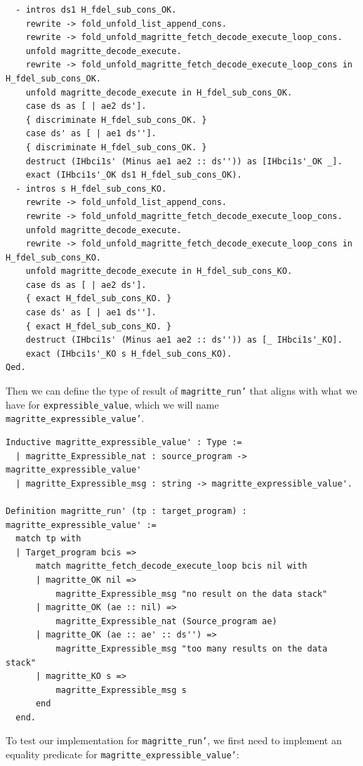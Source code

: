 \documentclass{article}
\begin{document}
\begin{lstlisting}
  - intros ds1 H_fdel_sub_cons_OK.
    rewrite -> fold_unfold_list_append_cons.
    rewrite -> fold_unfold_magritte_fetch_decode_execute_loop_cons.
    unfold magritte_decode_execute.
    rewrite -> fold_unfold_magritte_fetch_decode_execute_loop_cons in H_fdel_sub_cons_OK.
    unfold magritte_decode_execute in H_fdel_sub_cons_OK.
    case ds as [ | ae2 ds'].
    { discriminate H_fdel_sub_cons_OK. }
    case ds' as [ | ae1 ds''].
    { discriminate H_fdel_sub_cons_OK. }    
    destruct (IHbci1s' (Minus ae1 ae2 :: ds'')) as [IHbci1s'_OK _].
    exact (IHbci1s'_OK ds1 H_fdel_sub_cons_OK).
  - intros s H_fdel_sub_cons_KO.
    rewrite -> fold_unfold_list_append_cons.
    rewrite -> fold_unfold_magritte_fetch_decode_execute_loop_cons.
    unfold magritte_decode_execute.
    rewrite -> fold_unfold_magritte_fetch_decode_execute_loop_cons in H_fdel_sub_cons_KO.
    unfold magritte_decode_execute in H_fdel_sub_cons_KO.
    case ds as [ | ae2 ds'].
    { exact H_fdel_sub_cons_KO. }
    case ds' as [ | ae1 ds''].
    { exact H_fdel_sub_cons_KO. }    
    destruct (IHbci1s' (Minus ae1 ae2 :: ds'')) as [_ IHbci1s'_KO].
    exact (IHbci1s'_KO s H_fdel_sub_cons_KO).
Qed.
\end{lstlisting}

Then we can define the type of result of \texttt{magritte\_run'} that aligns with what we have for \texttt{expressible\_value}, which we will name \texttt{magritte\_expressible\_value'}.
\begin{lstlisting}
Inductive magritte_expressible_value' : Type :=
  | magritte_Expressible_nat : source_program -> magritte_expressible_value'
  | magritte_Expressible_msg : string -> magritte_expressible_value'.

Definition magritte_run' (tp : target_program) : magritte_expressible_value' :=
  match tp with
  | Target_program bcis =>
      match magritte_fetch_decode_execute_loop bcis nil with
      | magritte_OK nil =>
          magritte_Expressible_msg "no result on the data stack"
      | magritte_OK (ae :: nil) =>
          magritte_Expressible_nat (Source_program ae)
      | magritte_OK (ae :: ae' :: ds'') =>
          magritte_Expressible_msg "too many results on the data stack"
      | magritte_KO s =>
          magritte_Expressible_msg s
      end
  end.
\end{lstlisting}

To test our implementation for \texttt{magritte\_run'}, we first need to implement an equality predicate for \texttt{magritte\_expressible\_value'}:
\end{document}
